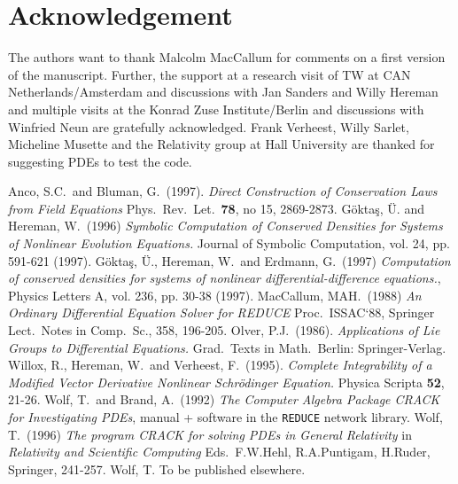 \section{Acknowledgement}
The authors want to thank Malcolm MacCallum for comments on a first
version of the manuscript. Further, the support
at a research visit of TW at CAN Netherlands/Amsterdam
and discussions with Jan Sanders and Willy Hereman
and multiple visits at the Konrad Zuse Institute/Berlin 
and discussions with Winfried Neun are gratefully acknowledged.
Frank Verheest, Willy Sarlet, Micheline Musette and the Relativity group 
at Hall University are thanked for suggesting PDEs to test the code.

\begin{thebibliography}{99}
 Anco, S.C.\ and Bluman, G.\ (1997). 
        {\it Direct Construction of Conservation Laws from Field Equations}
        Phys.\ Rev.\ Let.\ {\bf 78}, no 15, 2869-2873.
 G\"{o}kta\c{s}, \"{U}. and Hereman, W.\ (1996) {\it Symbolic
        Computation of Conserved Densities for Systems of Nonlinear
        Evolution Equations.} Journal of Symbolic Computation, 
        {vol. 24}, pp. 591-621 (1997).
 G\"{o}kta\c{s}, \"{U}., Hereman, W.\ and Erdmann, G.\ (1997) 
        {\it Computation of conserved densities for systems of nonlinear
        differential-difference equations.}, 
        Physics Letters A, {vol. 236}, pp. 30-38 (1997).
 MacCallum, MAH.\ (1988) {\it An Ordinary Differential Equation 
        Solver for REDUCE} Proc.\ ISSAC`88, Springer Lect.\ Notes in 
        Comp.\ Sc., 358, 196-205.
 Olver, P.J.\ (1986). {\it Applications of Lie Groups to
        Differential Equations.} Grad.\ Texts in Math.\ Berlin:
        Springer-Verlag.
 Willox, R., Hereman, W.\ and Verheest, F.\ (1995).
        {\it Complete Integrability of a Modified Vector Derivative
        Nonlinear Schr\"{o}dinger Equation.} Physica Scripta {\bf 52}, 21-26.
 Wolf, T.\ and Brand, A.\ (1992)
        {\it The Computer Algebra Package CRACK for Investigating
        PDEs}, manual + software in the {\tt REDUCE} network library.
 Wolf, T.\ (1996) {\it The program CRACK for solving PDEs
        in General Relativity} in {\it Relativity and Scientific Computing}
        Eds.\ F.W.Hehl, R.A.Puntigam, H.Ruder, Springer, 241-257.
 Wolf, T. To be published elsewhere.

\end{thebibliography}



